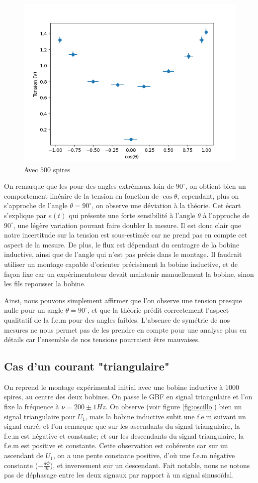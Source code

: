 \documentclass[11pt]{article}
\begin{document}
\begin{figure}[h!]
  \centering
  \includegraphics[width=.5\linewidth]{img/Graph_Angle.png}
  \caption{Avec $500$ spires}
  \label{fig:graphe_angle}
\end{figure}

On remarque que les pour des angles extrémaux loin de $90^{\circ}$, on obtient bien un comportement linéaire de la tension en fonction de $\cos \theta$,
cependant, plus on s'approche de l'angle $\theta = 90^{\circ}$, on observe une déviation à la théorie. Cet écart s'explique par $e(t)$ qui présente une forte
sensibilité à l'angle $\theta$ à l'approche de $90^{\circ}$, une légère variation pouvant faire doubler la mesure. Il est donc clair que notre incertitude sur la tension est sous-estimée
car ne prend pas en compte cet aspect de la mesure. De plus, le flux est dépendant du centragre de la bobine inductive, ainsi que de l'angle qui n'est pas précis dans le montage.
Il faudrait utiliser un montage capable d'orienter précisèment la bobine inductive, et de façon fixe car un expérimentateur devait maintenir manuellement la bobine, sinon les fils 
repousser la bobine. 

Ainsi, nous pouvons simplement affirmer que l'on observe une tension presque nulle pour un angle $\theta = 90^{\circ}$, et que la théorie prédit correctement l'aspect qualitatif de la f.e.m pour des angles faibles.
L'absence de symétrie de nos mesures ne nous permet pas de les prendre en compte pour une analyse plus en détails car l'ensemble de nos tensions pourraient être mauvaises.

\subsection{Cas d'un courant "triangulaire"}
On reprend le montage expérimental initial avec une bobine inductive à $1000$ spires, au centre des deux bobines. On passe le GBF en signal triangulaire et l'on fixe la fréquence
à $\nu = 200 \pm 1 Hz$. On observe (voir figure \ref{fig:oscillo}) bien un signal triangulaire pour $U_1$, mais la bobine inductive subit une f.e.m suivant un signal carré, et l'on remarque
que sur les ascendants du signal triangulaire, la f.e.m est négative et constante; et sur les descendants du signal triangulaire, la f.e.m est positive et constante.
Cette observation est cohérente car sur un ascendant de $U_1$, on a une pente constante positive, d'où une f.e.m négative constante ($-\frac{d\Phi}{dt}$), et inversement sur un descendant.
Fait notable, nous ne notons pas de déphasage entre les deux signaux par rapport à un signal sinusoïdal.
\end{document}

